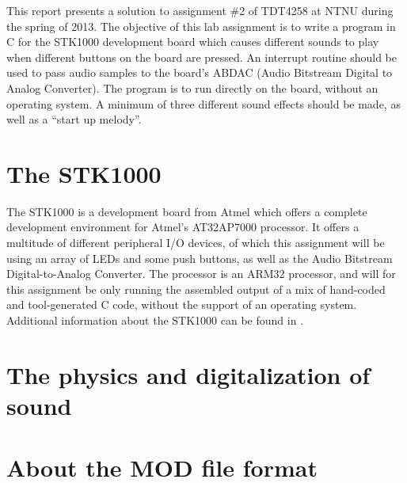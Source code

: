 This report presents a solution to assignment \#2 of TDT4258 at NTNU during the spring of 2013.
The objective of this lab assignment is to write a program in C for the STK1000 development board which causes different sounds to play when different buttons on the board are pressed.
An interrupt routine should be used to pass audio samples to the board's ABDAC (Audio Bitstream Digital to Analog Converter).
The program is to run directly on the board, without an operating system.
A minimum of three different sound effects should be made, as well as a ``start up melody''.

\section{The STK1000}
	The STK1000 is a development board from Atmel which offers a complete development environment for Atmel's AT32AP7000 processor.
	It offers a multitude of different peripheral I/O devices, of which this assignment will be using an array of LEDs and some push buttons, as well as the Audio Bitstream Digital-to-Analog Converter.
	The processor is an ARM32 processor, and will for this assignment be only running the assembled output of a mix of hand-coded and tool-generated C code, without the support of an operating system.
    Additional information about the STK1000 can be found in \cite{tdt4258-1}.

\section{The physics and digitalization of sound}
	


\section{About the MOD file format}
	
